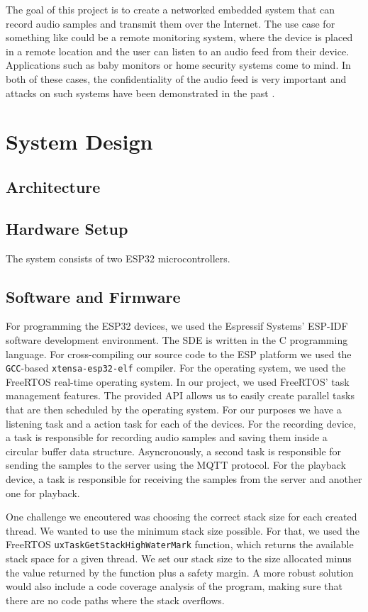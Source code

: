 \documentclass[conference]{IEEEtran}
\begin{document}
The goal of this project is to create a networked embedded system that can record audio samples and transmit them over the Internet.
The use case for something like could be a remote monitoring system, where the device is placed in a remote location and 
the user can listen to an audio feed from their device. Applications such as baby monitors or home security systems come to mind.
In both of these cases, the confidentiality of the audio feed is very important and
attacks on such systems have been demonstrated in the past \cite{BabyMonitorHack, VideoSurvAttacks}.

\section{System Design}
\label{sec:system_design}

\subsection{Architecture}
\subsection{Hardware Setup}
The system consists of two ESP32\cite{ESP32_Manual} microcontrollers.
\subsection{Software and Firmware}

For programming the ESP32 devices, we used the Espressif Systems' ESP-IDF\cite{ESP-IDF}
software development environment. The SDE is written in the C programming 
language. For cross-compiling our source code to the ESP platform we used the \texttt{GCC}-based
\texttt{xtensa-esp32-elf} compiler. 
For the operating system, we used the FreeRTOS\cite{FreeRTOS} real-time operating system.
In our project, we used FreeRTOS' task management features.
The provided API allows us to easily create parallel tasks that are then scheduled by the operating system.
For our purposes we have a listening task and a action task for each of the devices.
For the recording device, a task is responsible for recording audio samples and saving them 
inside a circular buffer data structure. Asyncronously, a second task is responsible for
sending the samples to the server using the MQTT protocol.
For the playback device, a task is responsible for receiving the samples from the server
and another one for playback.

One challenge we encoutered was choosing the correct stack size for each created thread.
We wanted to use the minimum stack size possible.
For that, we used the FreeRTOS \texttt{uxTaskGetStackHighWaterMark} function, which returns
the available stack space for a given thread.
We set our stack size to the size allocated minus the value returned by the function plus a safety margin.
A more robust solution would also include a code coverage analysis of the program,
making sure that there are no code paths where the stack overflows.
\end{document}
